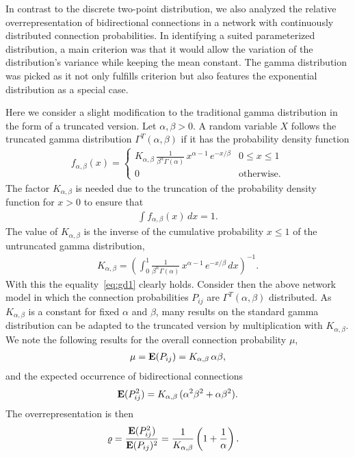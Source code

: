 
In contrast to the discrete two-point distribution, we also analyzed the relative overrepresentation of bidirectional connections in a network with continuously distributed connection probabilities. In identifying a suited parameterized distribution, a main criterion was that it would allow the variation of the distribution's variance while keeping the mean constant. The gamma distribution was picked as it not only fulfills criterion but also features the exponential distribution as a special case.

Here we consider a slight modification to the traditional gamma distribution in the form of a truncated version. Let $\alpha, \beta > 0$. A random variable $X$ follows the truncated gamma distribution $\Gamma^T(\alpha, \beta)$ if it has the probability density function 
%
\begin{align}
  f_{\alpha,\beta}(x) = \begin{cases} K_{\alpha, \beta}\,
\frac{1}{\beta^{\alpha}\Gamma(\alpha)}\, x^{\alpha-1}\,e^{-x/\beta} & 0 \leq x \leq 1 \\
0 & \text{otherwise}.
\end{cases}
\end{align}
%
The factor $K_{\alpha,\beta}$ is needed due to the truncation of the probability density function for $x>0$ to ensure that
\begin{align}
  \int f_{\alpha,\beta}(x) \,dx = 1. \label{eq:gd1}
\end{align}
The value of $K_{\alpha,\beta}$ is the inverse of the cumulative probability $x \leq 1$ of the untruncated gamma distribution,
\begin{align}
  K_{\alpha,\beta} = \left(\int_0^{1} \frac{1}{\beta^{\alpha}\Gamma(\alpha)}\, x^{\alpha-1}\,e^{-x/\beta} \, dx \right)^{-1}.
\end{align}
With this the equality~\eqref{eq:gd1} clearly holds. Consider then the above network model in which the connection probabilities $P_{ij}$ are $\Gamma^T(\alpha, \beta)$ distributed. As $K_{\alpha,\beta}$ is a constant for fixed $\alpha$ and $\beta$, many results on the standard gamma distribution can be adapted to the truncated version by multiplication with $K_{\alpha,\beta}$. We note the following results for the overall connection probability $\mu$,
%
\begin{align}
 \mu = \operatorname{\mathbf{E}}(P_{ij}) = K_{\alpha,\beta} \, \alpha \beta, \label{eq:gd1}
\end{align}
and the expected occurrence of bidirectional connections
\begin{align}
  \operatorname{\mathbf{E}}(P_{ij}^2) = K_{\alpha,\beta} \, (\alpha^2 \beta^2 + \alpha \beta^2).
\end{align}
%
The overrepresentation is then
\begin{align}
  \varrho & = \frac{\E(P_{ij}^2)}{\E(P_{ij})^2} =%
 \frac{1}{K_{\alpha,\beta}} \left(1 + \frac{1}{\alpha}\right).
\end{align}

